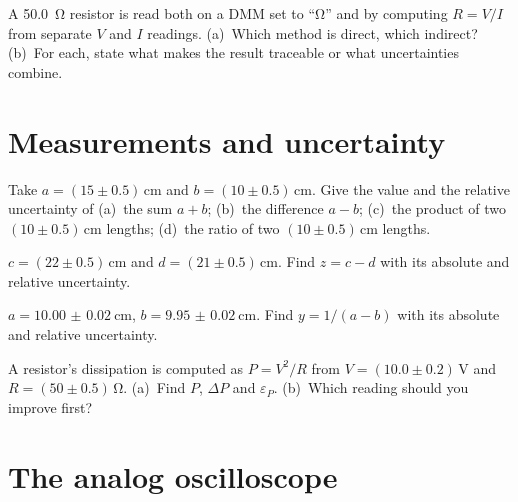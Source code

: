 \documentclass[11pt,a4paper,oneside]{book}
\begin{document}
\begin{exercise}
A \qty{50.0}{\ohm} resistor is read both on a DMM set to ``\si{\ohm}'' and by
computing $R=V/I$ from separate $V$ and $I$ readings.
(a)~Which method is direct, which indirect?
(b)~For each, state what makes the result traceable or what uncertainties
combine.
\end{exercise}

\chapter{Measurements and uncertainty}

\begin{exercise}
Take $a=(15\pm0.5)\,\unit{\centi\meter}$ and $b=(10\pm0.5)\,\unit{\centi\meter}$.
Give the value and the relative uncertainty of
(a)~the sum $a+b$; (b)~the difference $a-b$; (c)~the product of two
$(10\pm0.5)\,\unit{\centi\meter}$ lengths; (d)~the ratio of two
$(10\pm0.5)\,\unit{\centi\meter}$ lengths.
\end{exercise}

\begin{exercise}
$c=(22\pm0.5)\,\unit{\centi\meter}$ and $d=(21\pm0.5)\,\unit{\centi\meter}$.
Find $z=c-d$ with its absolute and relative uncertainty.
\end{exercise}

\begin{exercise}
$a=\qty{10.00(2)}{\centi\meter}$, $b=\qty{9.95(2)}{\centi\meter}$. Find
$y=1/(a-b)$ with its absolute and relative uncertainty.
\end{exercise}

\begin{exercise}
A resistor's dissipation is computed as $P=V^2/R$ from
$V=(10.0\pm0.2)\,\unit{\volt}$ and $R=(50\pm0.5)\,\unit{\ohm}$.
(a)~Find $P$, $\Delta P$ and $\varepsilon_P$.
(b)~Which reading should you improve first?
\end{exercise}

\chapter{The analog oscilloscope}
\end{document}

